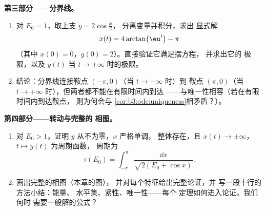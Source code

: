\begin{problem}
\medskip
\noindent\textbf{第三部分——分界线。}
\begin{enumerate}[resume]
  \item 对 $E_0 = 1$，取上支 $y = 2\cos\frac x2$，
        分离变量并积分，求出
        显式解
        \[
        x(t) = 4\arctan\bigl(\eu^{t}\bigr) - \pi
        \]
        （其中 $x(0) = 0$，$y(0) = 2$）。直接验证它满足摆方程，
        并求出它的
        极限，以及 $y(t)$ 当 $t \to
        \pm\infty$ 时的极限。
  \item 结论：分界线连接鞍点
        $(-\pi, 0)$（当 $t \to -\infty$ 时）到
        鞍点 $(\pi, 0)$（当 $t \to +\infty$ 时），但两者都不能在有限时间内到达
        ——与唯一性相容（若在有限时间内到达鞍点，
        则为何会与
        \cref{cor:b3:ode:uniqueness}相矛盾？）。
\end{enumerate}

\medskip
\noindent\textbf{第四部分——转动与完整的
相图。}
\begin{enumerate}[resume]
  \item 对 $E_0 > 1$，证明 $y$ 从不为零，$x$ 严格单调，
        整体存在，且 $x(t) \to
        \pm\infty$，$t \mapsto y(t)$ 为周期函数，
        周期为
        \[
        \tau(E_0) = \int_{-\pi}^{\pi}
        \frac{\dd x}{\sqrt{2(E_0 + \cos x)}} .
        \]
  \item 画出完整的相图（本章的图），
        并对每个特征给出完整论证，并
        写一段十行的方法小结：能量、
        水平集、紧性、唯一性——每个
        定理如何进入论证。我们何时
        需要一般解的公式？
\end{enumerate}


\end{problem}
